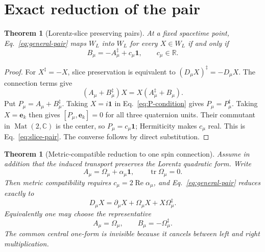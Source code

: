 \documentclass[12pt,a4paper]{article}
\newtheorem{theorem}[definition]{Theorem}
\theoremstyle{remark}\newtheorem{remark}[definition]{Remark}
\begin{document}
\section{Exact reduction of the pair}
\begin{theorem}[Lorentz-slice preserving pairs]
At a fixed spacetime point, Eq.~\eqref{eq:general-pair} maps $W_L$ into
$W_L$ for every $X\in W_L$ if and only if
\begin{equation}
 \boxed{B_\mu=-A_\mu^\ddagger+c_\mu\mathbf1,\qquad c_\mu\in\mathbb R.}
 \label{eq:slice-pair}
\end{equation}
\end{theorem}

\begin{proof}
For $X^\ddagger=-X$, slice preservation is equivalent to
$(D_\mu X)^\ddagger=-D_\mu X$.  The connection terms give
\begin{equation}
 (A_\mu+B_\mu^\ddagger)X
 =X(A_\mu^\ddagger+B_\mu).
 \label{eq:P-condition}
\end{equation}
Put $P_\mu=A_\mu+B_\mu^\ddagger$.  Taking $X=i\mathbf1$ in
Eq.~\eqref{eq:P-condition} gives $P_\mu=P_\mu^\ddagger$.  Taking
$X=\mathbf e_k$ then gives $[P_\mu,\mathbf e_k]=0$ for all three quaternion
units.  Their commutant in $\operatorname{Mat}(2,\mathbb C)$ is the center,
so $P_\mu=c_\mu\mathbf1$; Hermiticity makes $c_\mu$ real.  This is
Eq.~\eqref{eq:slice-pair}.  The converse follows by direct substitution.
\end{proof}

\begin{theorem}[Metric-compatible reduction to one spin connection]
Assume in addition that the induced transport preserves the Lorentz quadratic
form.  Write
\begin{equation}
 A_\mu=\Omega_\mu+\alpha_\mu\mathbf1,
 \qquad \operatorname{tr}\Omega_\mu=0.
\end{equation}
Then metric compatibility requires
$c_\mu=2\operatorname{Re}\alpha_\mu$, and Eq.~\eqref{eq:general-pair}
reduces exactly to
\begin{equation}
 \boxed{D_\mu X=\partial_\mu X+\Omega_\mu X+X\Omega_\mu^\ddagger.}
 \label{eq:lorentz-pair}
\end{equation}
Equivalently one may choose the representative
\begin{equation}
 \boxed{A_\mu=\Omega_\mu,\qquad B_\mu=-\Omega_\mu^\ddagger.}
 \label{eq:A-B-Omega}
\end{equation}
The common central one-form is invisible because it cancels between left and
right multiplication.
\end{theorem}
\end{document}

